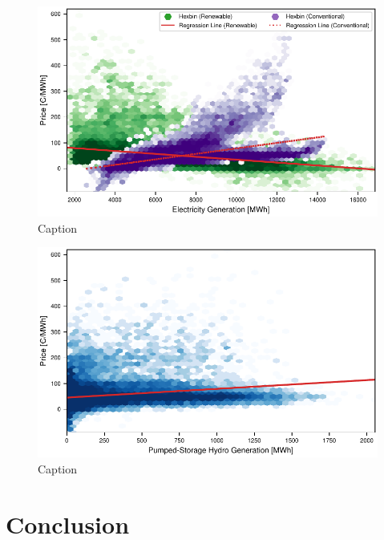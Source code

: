 \documentclass{article}
\begin{document}
\begin{figure}[h]
    \centering
    \includegraphics[width=\columnwidth]{doc/fig/ren_vs_con_regression.pdf}
    \caption{Caption}
    \label{fig:ren_vs_con_regression}
\end{figure}


\begin{figure}
    \centering
    \includegraphics[width=\columnwidth]{doc/fig/pumped_hydro_regression.pdf}
    \caption{Caption}
    \label{fig:pumped_hydro_regression}
\end{figure}

\section{Conclusion}



\end{document}
